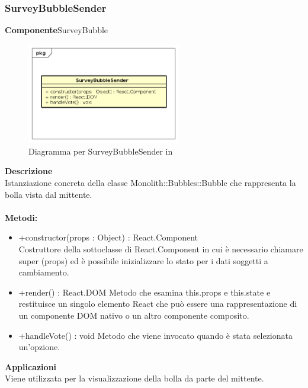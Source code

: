 \clearpage

\subsubsection{SurveyBubbleSender}
\textbf{Componente}SurveyBubble\\
   \FloatBarrier
   \begin{figure}[ht]
   \centering
   \includegraphics[width=0.6\textwidth]{img/single-SurveyBubbleSender}
   \caption{{Diagramma per SurveyBubbleSender in }}
\end{figure}
\FloatBarrier
\textbf{Descrizione}\\
Istanziazione concreta della classe Monolith::Bubbles::Bubble che rappresenta la bolla vista dal mittente.
\\
\\
\textbf{Metodi:} 
\begin{itemize}
\item +constructor(props : Object) : React.Component 
\\
Costruttore della sottoclasse di React.Component in cui è necessario chiamare super (props) ed è possibile inizializzare lo stato per i dati soggetti a cambiamento.

\item +render() : React.DOM
Metodo che esamina this.props e this.state e restituisce un singolo elemento React che può essere una rappresentazione di un componente DOM nativo o un altro componente composito.

\item +handleVote() : void
Metodo che viene invocato quando è stata selezionata un'opzione. 

\end{itemize} 


\textbf{Applicazioni}\\
Viene utilizzata per la visualizzazione della bolla da parte del mittente. 


\clearpage

